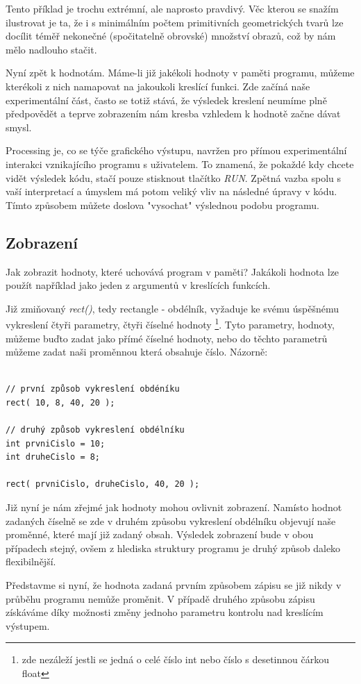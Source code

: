 \documentclass[12pt,twopage]{book}
\newcommand{\pododdil}[1]{\subsection{#1}\label{subsec:#1}}
\newcommand{\vyraz}[1]{\textit{\gls{#1}}\index{#1}}
\begin{document}
Tento příklad je trochu extrémní, ale naprosto pravdivý. Věc kterou se snažím ilustrovat je ta, že i s minimálním počtem primitivních geometrických tvarů lze docílit téměř nekonečné (spočitatelně obrovské) množství obrazů, což by nám mělo nadlouho stačit.

Nyní zpět k hodnotám. Máme-li již jakékoli hodnoty v paměti programu, můžeme kterékoli z nich namapovat na jakoukoli kreslící funkci. Zde začíná naše experimentální část, často se totiž stává, že výsledek kreslení neumíme plně předpovědět a teprve zobrazením nám kresba vzhledem k hodnotě začne dávat smysl.

Processing je, co se týče grafického výstupu, navržen pro přímou experimentální interakci vznikajícího programu s uživatelem. To znamená, že pokaždé kdy chcete vidět výsledek kódu, stačí pouze stisknout tlačítko {\em RUN}. Zpětná vazba spolu s vaší interpretací a úmyslem má potom veliký vliv na následné úpravy v kódu. Tímto způsobem můžete doslova "vysochat" výslednou podobu programu.

\pododdil{Zobrazení}

Jak zobrazit hodnoty, které uchovává program v paměti? Jakákoli hodnota lze použít například jako jeden z argumentů v kreslících funkcích.

Již zmiňovaný \vyraz{rect()}, tedy rectangle - obdélník, vyžaduje ke svému úspěšnému vykreslení čtyři parametry, čtyři číselné hodnoty \footnote{zde nezáleží jestli se jedná o celé číslo int nebo číslo s desetinnou čárkou float}. Tyto parametry, hodnoty, můžeme buďto zadat jako přímé číselné hodnoty, nebo do těchto parametrů můžeme zadat naši proměnnou která obsahuje číslo. Názorně:

\begin{lstlisting}

// první způsob vykreslení obdéníku
rect( 10, 8, 40, 20 );

// druhý způsob vykreslení obdélníku
int prvniCislo = 10;
int druheCislo = 8;

rect( prvniCislo, druheCislo, 40, 20 );

\end{lstlisting}

Již nyní je nám zřejmé jak hodnoty mohou ovlivnit zobrazení. Namísto hodnot zadaných číselně se zde v druhém způsobu vykreslení obdélníku objevují naše proměnné, které mají již zadaný obsah. Výsledek zobrazení bude v obou případech stejný, ovšem z hlediska struktury programu je druhý způsob daleko flexibilnější.

Představme si nyní, že hodnota zadaná prvním způsobem zápisu se již nikdy v průběhu programu nemůže proměnit. V případě druhého způsobu zápisu získáváme díky možnosti změny jednoho parametru kontrolu nad kreslícím výstupem.
\end{document}
